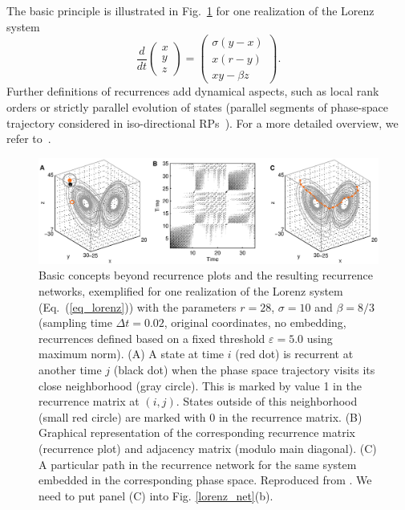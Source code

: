 The basic principle is illustrated in Fig.~\ref{lorenz_constr} for one realization of the Lorenz system 
\begin{equation}
\frac{d}{dt}\left(\begin{array}{c}x\\y\\z\end{array}\right)=\left(\begin{array}{c}\sigma(y-x) \\ x(r-y)\\ xy-\beta z \end{array}\right).
\label{eq_lorenz}
\end{equation}
\noindent
Further definitions of recurrences add dynamical aspects, such as local rank orders or strictly parallel evolution of states (parallel segments of phase-space trajectory considered in iso-directional RPs~\cite{Horai2002}). For a more detailed overview, we refer to~\cite{marwan2007}.
\begin{figure}[thb]
	\centering
	\includegraphics[width=\textwidth]{Chapter03_RecurrenceNt/lorenz_constr.eps}
\caption{Basic concepts beyond recurrence plots and the resulting recurrence networks, exemplified for one realization of the Lorenz system (Eq.~(\ref{eq_lorenz})) with the parameters $r=28$, $\sigma=10$ and $\beta=8/3$ (sampling time $\Delta t=0.02$, original coordinates, no embedding, recurrences defined based on a fixed threshold $\varepsilon=5.0$ using maximum norm). (A) A state at time $i$ (red dot) is recurrent at another time $j$ (black dot) when the phase space trajectory visits its close neighborhood (gray circle). This is marked by value 1 in the recurrence matrix at $(i,j)$. States outside of this neighborhood (small red circle) are marked with 0 in the recurrence matrix. (B) Graphical representation of the corresponding recurrence matrix (recurrence plot) and adjacency matrix (modulo main diagonal). (C) A particular path in the recurrence network for the same system embedded in the corresponding phase space. Reproduced from \cite{Donner2011}. {\color{red} We need to put panel (C) into Fig. \ref{lorenz_net}(b). }}
\label{lorenz_constr}
\end{figure}

